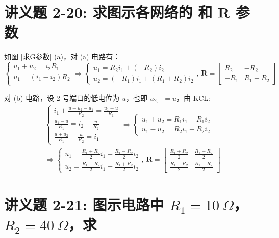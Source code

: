 \documentclass[UTF8]{report}
\theoremstyle{MyLineTheoremStyle} %
\theoremstyle{MyBlockTheoremStyle} %
\theoremstyle{MySubsubsectionStyle} %
\begin{document}
\section{讲义题 2-20: 求图示各网络的 和 $\boldsymbol{R}$ 参数}


如图 \ref{求G参数} (a)，对 (a) 电路有：
\begin{equation}
\begin{cases}
    u_1 + u_2 = i_2R_1 \\ 
    u_1 = (i_1 - i_2)R_2 \\ 
\end{cases}
\Longrightarrow 
\begin{cases}
    u_1 = R_2 i_1 + (-R_2)i_2 \\ 
    u_2 = (-R_1)i_1 + (R_1+R_2)i_2
\end{cases},\ 
\boldsymbol{R} = 
\begin{bmatrix}
    R_2 & -R_2 \\ 
    -R_1 & R_1+R_2
\end{bmatrix}
\end{equation}

对 (b) 电路，设 2 号端口的低电位为 $u$，也即 $u_{2,-} = u$，由 KCL: 
\begin{gather}
\begin{cases}
    i_1 + \frac{u+u_2 - u_1}{R_2} = \frac{u_1 - u}{R_1} \\ 
    \frac{u_1 - u}{R_1} = i_2 + \frac{u}{R_2} \\ 
    \frac{u+u_2}{R_1} + \frac{u}{R_2} = i_1
\end{cases}
\Longrightarrow
\begin{cases}
    u_1 + u_2 = R_1i_1 + R_1i_2 \\ 
    u_1 - u_2 = R_2i_1 - R_2i_2
\end{cases} 
\\
\Longrightarrow 
\begin{cases}
    u_1 = \frac{R_1+R_2}{2}i_1 + \frac{R_1-R_2}{2}i_2 \\
    u_2 = \frac{R_1-R_2}{2}i_1 + \frac{R_1+R_2}{2}i_2
\end{cases},\ 
\boldsymbol{R} = 
\begin{bmatrix}
    \frac{R_1+R_2}{2} & \frac{R_1-R_2}{2} \\ 
    \frac{R_1-R_2}{2} & \frac{R_1+R_2}{2}
\end{bmatrix}
\end{gather}



\section{讲义题 2-21: 图示电路中 $R_1 = 10\ \Omega$，$R_2 = 40\ \Omega$，求}
\end{document}
